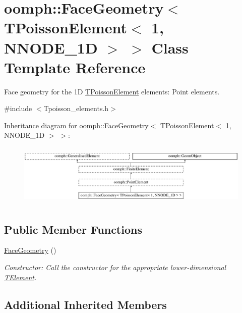 \hypertarget{classoomph_1_1FaceGeometry_3_01TPoissonElement_3_011_00_01NNODE__1D_01_4_01_4}{}\section{oomph\+:\+:Face\+Geometry$<$ T\+Poisson\+Element$<$ 1, N\+N\+O\+D\+E\+\_\+1D $>$ $>$ Class Template Reference}
\label{classoomph_1_1FaceGeometry_3_01TPoissonElement_3_011_00_01NNODE__1D_01_4_01_4}


Face geometry for the 1D \hyperlink{classoomph_1_1TPoissonElement}{T\+Poisson\+Element} elements\+: Point elements.  




{\ttfamily \#include $<$Tpoisson\+\_\+elements.\+h$>$}

Inheritance diagram for oomph\+:\+:Face\+Geometry$<$ T\+Poisson\+Element$<$ 1, N\+N\+O\+D\+E\+\_\+1D $>$ $>$\+:\begin{figure}[H]
\begin{center}
\leavevmode
\includegraphics[height=3.002681cm]{classoomph_1_1FaceGeometry_3_01TPoissonElement_3_011_00_01NNODE__1D_01_4_01_4}
\end{center}
\end{figure}
\subsection*{Public Member Functions}
\begin{DoxyCompactItemize}
\item 
\hyperlink{classoomph_1_1FaceGeometry_3_01TPoissonElement_3_011_00_01NNODE__1D_01_4_01_4_a41307cb1340612c68be7024d92f2a467}{Face\+Geometry} ()
\begin{DoxyCompactList}\small\item\em Constructor\+: Call the constructor for the appropriate lower-\/dimensional \hyperlink{classoomph_1_1TElement}{T\+Element}. \end{DoxyCompactList}\end{DoxyCompactItemize}
\subsection*{Additional Inherited Members}


